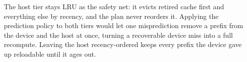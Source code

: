 The host tier stays LRU as the safety net: it evicts retired cache first and everything else by recency, and the plan never reorders it. Applying the prediction policy to both tiers would let one misprediction remove a prefix from the device and the host at once, turning a recoverable device miss into a full recompute. Leaving the host recency-ordered keeps every prefix the device gave up reloadable until it ages out.

